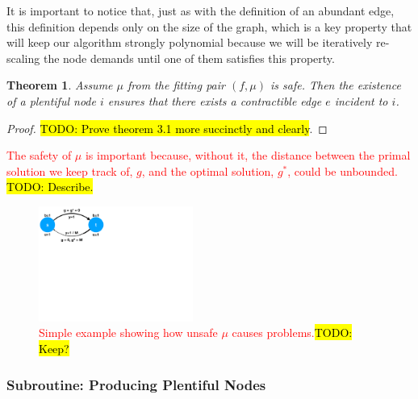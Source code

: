 \documentclass[11pt]{article}
\newtheorem{theorem}{Theorem}[section]
\theoremstyle{definition}
\theoremstyle{definition}
\newcommand{\rewrite}[1]{\textcolor{red}{#1}}
\newcommand{\todo}[1]{\hl{TODO: #1}}
\begin{document}
		It is important to notice that, just as with the definition of an abundant  edge,
		this definition depends only on the size of the graph, which is a key property
		that will keep our algorithm strongly polynomial because we will be iteratively
		re-scaling the node demands until one of them satisfies this property.
		
		\begin{theorem} Assume $\mu$ from the fitting pair $(f,\mu)$ is safe.
		Then the existence of a plentiful node $i$ ensures
		that there exists a contractible edge $e$ incident to $i$.
		\end{theorem}
		\begin{proof}
		\todo{Prove theorem 3.1 more succinctly and clearly}.
		\end{proof}
		
		\rewrite{The safety of $\mu$ is important because, without it, the distance between
		the primal solution we keep track of, $g$, and the optimal solution, $g^*$, could
		be unbounded.} \todo{Describe.}
		
		\begin{figure}[h]
		\centering
		\includegraphics[width=0.45\textwidth]{figs/unsafe.pdf}
		\caption{
		\label{fig:unsafe}
		\rewrite{Simple example showing how unsafe $\mu$ causes problems.}\todo{Keep?}
		}
		\end{figure}

		\subsubsection{Subroutine: Producing Plentiful Nodes}
		\label{sec:sub-ppn}
		
\end{document}
